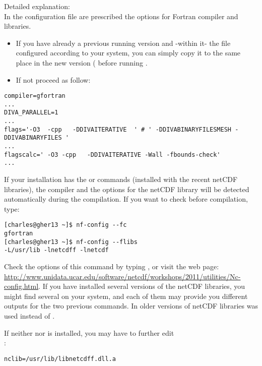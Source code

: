 Detailed explanation:\\
In the configuration file  are prescribed the options for Fortran compiler and libraries.
\begin{itemize}
\item If you have already a previous running \diva version and -within it- the file \\  configured according to your system, you can simply copy it to the same place in the new version ( before running  .
\item If not proceed as follow:
\end{itemize}

\begin{verbatim}
compiler=gfortran
...
DIVA_PARALLEL=1
...
flags='-O3  -cpp   -DDIVAITERATIVE  ' # ' -DDIVABINARYFILESMESH -DDIVABINARYFILES '
...
flagscalc=' -O3 -cpp   -DDIVAITERATIVE -Wall -fbounds-check'
...
\end{verbatim}

If your installation has the  or  commands (installed with the recent netCDF libraries), the compiler and the options for the netCDF  library will be detected automatically during the compilation. If you want to check before compilation, type:
\begin{lstlisting}[style=Bash]
[charles@gher13 ~]$ nf-config --fc
gfortran
[charles@gher13 ~]$ nf-config --flibs
-L/usr/lib -lnetcdff -lnetcdf
\end{lstlisting}
Check the options of this command by typing , or visit the web page: \url{http://www.unidata.ucar.edu/software/netcdf/workshops/2011/utilities/Nc-config.html}. If you have installed several versions of the netCDF libraries, you might find several  on your system, and each of them may provide you different outputs for the two previous commands. In older versions of netCDF libraries  was used instead of .

If neither  nor  is installed, you may have to further edit\\ 
:
\begin{verbatim}
nclib=/usr/lib/libnetcdff.dll.a
\end{verbatim}


